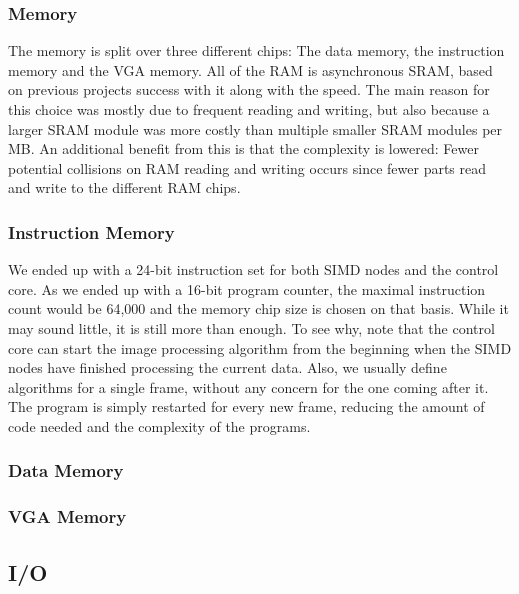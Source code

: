 \subsubsection{Memory}
The memory is split over three different chips: The data memory, the
instruction memory and the \ac{VGA} memory. All of the \ac{RAM} is asynchronous
\ac{SRAM}, based on previous projects success with
it\cite{berg2011festinalente} along with the speed. The main reason for this
choice was mostly due to frequent reading and writing, but also because a
larger \ac{SRAM} module was more costly than multiple smaller \ac{SRAM} modules
per \ac{MB}. An additional benefit from this is that the complexity is lowered:
Fewer potential collisions on \ac{RAM} reading and writing occurs since fewer
parts read and write to the different \ac{RAM} chips.

\subsubsection*{Instruction Memory}
We ended up with a 24-bit instruction set for both \ac{SIMD} nodes and the
control core. As we ended up with a 16-bit program counter, the maximal
instruction count would be 64,000 and the memory chip size is chosen on that
basis. While it may sound little, it is still more than enough. To see why,
note that the control core can start the image processing algorithm from the
beginning when the \ac{SIMD} nodes have finished processing the current data.
Also, we usually define algorithms for a single frame, without any concern
for the one coming after it. The program is simply restarted for every new frame,
reducing the amount of code needed and the complexity of the programs.

\subsubsection*{Data Memory}

\subsubsection*{VGA Memory}

\subsection{I/O}

